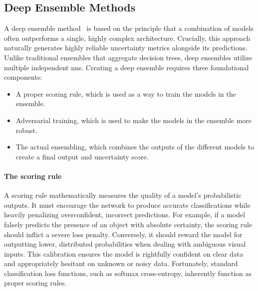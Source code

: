 \subsection{Deep Ensemble Methods} \label{ch:literature-study_section:uncertainty-aware-ai-models_subsection:deep-ensemble-methods}
A deep ensemble method~\cite{src:deep-ensemble-methods} is based on the principle that a combination of models often outperforms a single, highly complex architecture.
Crucially, this approach naturally generates highly reliable uncertainty metrics alongside its predictions.
Unlike traditional ensembles that aggregate decision trees, deep ensembles utilize multiple independent \glspl{nn}.
Creating a deep ensemble requires three foundational components:
\begin{itemize}
    \item A proper scoring rule, which is used as a way to train the models in the ensemble.
    \item Adversarial training, which is used to make the models in the ensemble more robust.
    \item The actual ensembling, which combines the outputs of the different models to create a final output and uncertainty score.
\end{itemize}

\paragraph{The scoring rule}
A scoring rule mathematically measures the quality of a model's probabilistic outputs.
It must encourage the network to produce accurate classifications while heavily penalizing overconfident, incorrect predictions.
For example, if a model falsely predicts the presence of an object with absolute certainty, the scoring rule should inflict a severe loss penalty.
Conversely, it should reward the model for outputting lower, distributed probabilities when dealing with ambiguous visual inputs.
This calibration ensures the model is rightfully confident on clear data and appropriately hesitant on unknown or noisy data.
Fortunately, standard classification loss functions, such as softmax cross-entropy, inherently function as proper scoring rules.

